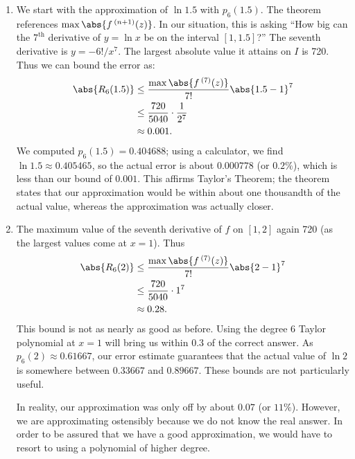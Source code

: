 {\begin{enumerate}
\item	We start with the approximation of $\ln 1.5$ with $p_6(1.5)$.
%
The theorem references $\max\abs{f\,^{(n+1)}(z)}$. In our situation, this is asking ``How big can the $7^\text{th}$ derivative of $y=\ln x$ be on the interval $[1,1.5]$?'' The seventh derivative is $y = -6!/x^7$. The largest absolute value it attains on $I$ is 720. Thus we can bound the error as:
\begin{align*}
	\abs{R_6(1.5)}
	&\leq \frac{\max\abs{f\,^{(7)}(z)}}{7!}\abs{1.5-1}^7\\
	&\leq \frac{720}{5040}\cdot\frac1{2^7}\\
	&\approx 0.001.
\end{align*}
We computed $p_6(1.5) = 0.404688$; using a calculator, we find $\ln 1.5 \approx 0.405465$, so the actual error is about $0.000778$ (or $0.2\%$), which is less than our bound of $0.001$. This affirms Taylor's Theorem; the theorem states that our approximation would be within about one thousandth of the actual value, whereas the approximation was actually closer.

	\item	%
	The maximum value of the seventh derivative of $f$ on $[1,2]$ %
	again 720 (as the largest values come at $x=1$). Thus 
\begin{align*}
	\abs{R_6(2)}
	&\leq \frac{\max\abs{f\,^{(7)}(z)}}{7!}\abs{2-1}^7\\
	&\leq \frac{720}{5040}\cdot1^7\\
	&\approx 0.28.
\end{align*}
This bound is not as nearly as good as before. Using the degree 6 Taylor polynomial at $x =1$ will bring us within 0.3 of the correct answer. As $p_6(2)\approx 0.61667$, our error estimate guarantees that the actual value of $\ln 2$ is somewhere between $0.33667$ and $0.89667$. These bounds are not particularly useful.

In reality, our approximation was only off by about $0.07$ (or $11\%$). However, we are approximating ostensibly because we do not know the real answer. In order to be assured that we have a good approximation, we would have to resort to using a polynomial of higher degree.\eoehere
\end{enumerate}}

